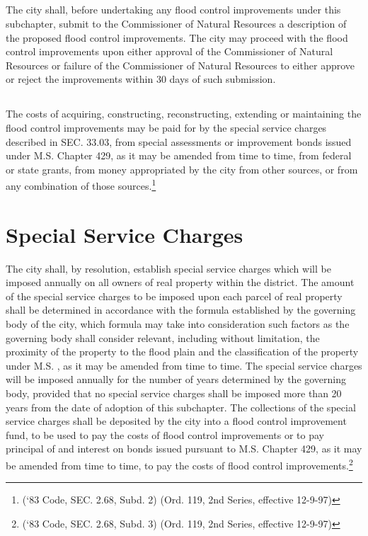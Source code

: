 \subsection{}
The city shall, before undertaking any flood control improvements under this subchapter, submit to the Commissioner of Natural Resources a description of the proposed flood control improvements.  The city may proceed with the flood control improvements upon either  approval of the Commissioner of Natural Resources or failure of the Commissioner of Natural Resources to either approve or reject the improvements within 30 days of such submission.
\subsection{}
The costs of acquiring, constructing, reconstructing, extending or maintaining the flood control improvements may be paid for by the special service charges described in SEC. 33.03, from special assessments or improvement bonds issued under M.S. Chapter 429, as it may be amended from time to time, from federal or state grants, from money appropriated by the city from other sources, or from any combination of those sources.\footnote{(‘83 Code, SEC. 2.68, Subd. 2)  (Ord. 119, 2nd Series, effective 12-9-97)}
\section{Special Service Charges}
The city shall, by resolution, establish special service charges which will be imposed annually on all owners of real property within the district. The amount of the special service charges to be imposed upon each parcel of real property shall be determined in accordance with the formula established by the governing body of the city, which formula may take into consideration such factors as the governing body shall consider relevant, including without limitation, the proximity of the property to the flood plain and the classification of the property under M.S. , as it may be amended from time to time. The special service charges will be imposed annually for the number of years determined by the governing body, provided that no special service charges shall be imposed more than 20 years from the date of adoption of this subchapter. The collections of the special service charges shall be deposited by the city into a flood control improvement fund, to be used to pay the costs of flood control improvements or to pay principal of and interest on bonds issued pursuant to M.S. Chapter 429, as it may be amended from time to time, to pay the costs of flood control improvements.\footnote{(‘83 Code, SEC. 2.68, Subd. 3)  (Ord. 119, 2nd Series, effective 12-9-97)}\\

